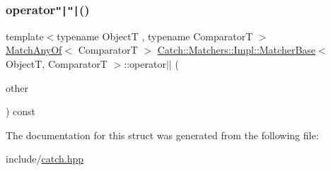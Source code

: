 \mbox{\label{structCatch_1_1Matchers_1_1Impl_1_1MatcherBase_ae0345ee76d109ac6d0241be261450ebc}} 
\subsubsection{\texorpdfstring{operator\texttt{"|}\texttt{"|}()}{operator||()}}
{\footnotesize\ttfamily template$<$typename ObjectT , typename ComparatorT $>$ \\
\mbox{\hyperlink{structCatch_1_1Matchers_1_1Impl_1_1MatchAnyOf}{Match\+Any\+Of}}$<$ ComparatorT $>$ \mbox{\hyperlink{structCatch_1_1Matchers_1_1Impl_1_1MatcherBase}{Catch\+::\+Matchers\+::\+Impl\+::\+Matcher\+Base}}$<$ ObjectT, ComparatorT $>$\+::operator$\vert$$\vert$ (\begin{DoxyParamCaption}\item[{\mbox{\hyperlink{structCatch_1_1Matchers_1_1Impl_1_1MatcherBase}{Matcher\+Base}}$<$ ObjectT, ComparatorT $>$ const \&}]{other }\end{DoxyParamCaption}) const}



The documentation for this struct was generated from the following file\+:\begin{DoxyCompactItemize}
\item 
include/\mbox{\hyperlink{catch_8hpp}{catch.\+hpp}}\end{DoxyCompactItemize}
